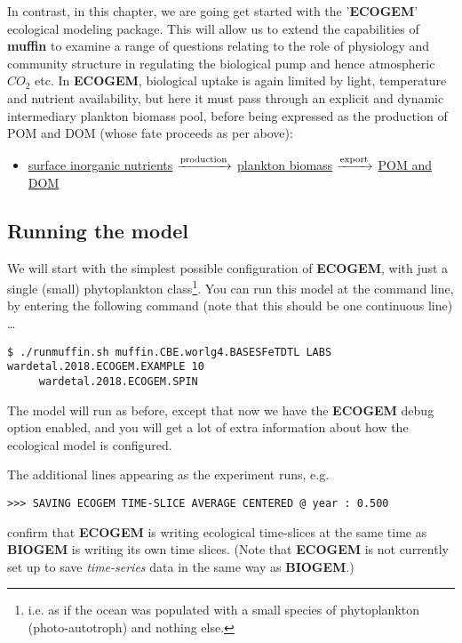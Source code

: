 \documentclass[11pt,fleqn]{book} %
\begin{document}
In contrast, in this chapter, we are going get started with the '\textbf{ECOGEM}' ecological modeling package. This will allow us to extend the capabilities of \textbf{muffin} to examine a range of questions relating to the role of physiology and community structure in regulating the biological pump and hence atmospheric \(CO_{2}\) etc. In \textbf{ECOGEM}, biological uptake is again limited by light, temperature and nutrient availability, but here it must pass through an explicit and dynamic intermediary plankton biomass pool, before being expressed as the production of POM and DOM (whose fate proceeds as per above):
\vspace{4mm}
\begin{itemize}
\item \underline{surface inorganic nutrients} $\xrightarrow[]{\rm production}$ \underline{plankton biomass} $\xrightarrow[]{\rm export}$ \underline{POM and DOM}
\end{itemize}
\vspace{4mm}


\subsection{Running the model}

We will start with the simplest possible configuration of \textbf{ECOGEM}, with just a single (small) phytoplankton class\footnote{i.e. as if the ocean was populated with a small species of phytoplankton (photo-autotroph) and nothing else.}. You can run this model at the command line, by entering the following command (note that this should be one continuous line) \dots
\small\begin{verbatim}
$ ./runmuffin.sh muffin.CBE.worlg4.BASESFeTDTL LABS wardetal.2018.ECOGEM.EXAMPLE 10 
     wardetal.2018.ECOGEM.SPIN
\end{verbatim}\normalsize
The model will run as before, except that now we have the \textbf{ECOGEM} debug option enabled, and you will get a lot of extra information about how the ecological model is configured.
\vspace{1mm}

The additional lines appearing as the experiment runs, e.g.
\vspace{-1mm}\small\begin{verbatim}
>>> SAVING ECOGEM TIME-SLICE AVERAGE CENTERED @ year : 0.500
\end{verbatim}\normalsize\vspace{-1mm}
confirm that \textbf{ECOGEM} is writing ecological time-slices at the same time as \textbf{BIOGEM} is writing its own time slices. (Note that \textbf{ECOGEM} is not currently set up to save \textit{time-series} data in the same way as \textbf{BIOGEM}.)
\end{document}
